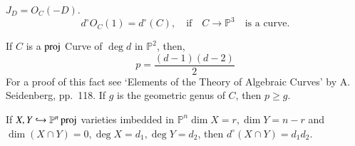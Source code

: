 \begin{def*}
$J_D=O_C(-D)$.
$$
d^\circ O_C(1)=d^\circ (C),\quad\text{if}\quad C\longrightarrow
\mathbb{P}^3\quad\text{is a curve}.
$$

If $C$ is a $\operatorname{proj}$ Curve of $\deg d$ in $\mathbb{P}^2$, then, 
$$
p=\frac{(d-1)(d-2)}{2}
$$
For a proof of this fact see `Elements of the Theory of Algebraic
Curves' by A. Seidenberg, pp.~118. If $g$ is the geometric genus of
$C$, then $p\geq g$.
\end{def*}

\begin{bezout'sthm*}\label{chap1:bezthm}
If $X,Y\hookrightarrow\mathbb{P}^n \operatorname{proj}$ varieties imbedded in
$\mathbb{P}^n \dim X=r,\dim Y=n-r$ and $\dim(X\cap Y)=0,\deg
X=d_1,\deg Y=d_2$, then $d^\circ(X\cap Y)=d_1d_2$.
\end{bezout'sthm*}

